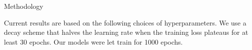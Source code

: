 \documentclass[final,20pt]{beamer}
\newlength{\colwidth}
\begin{document}
\begin{frame}[t, fragile]
\begin{columns}[t]
\begin{column}{\colwidth}
\begin{block}{Methodology}











    Current results are based on the following choices of hyperparameters.
    We use a decay scheme that halves the learning rate
    when the training loss plateaus for at least 30 epochs.
    Our models were let train for 1000 epochs.


\end{block}
\end{column}
\end{columns}
\end{frame}
\end{document}
